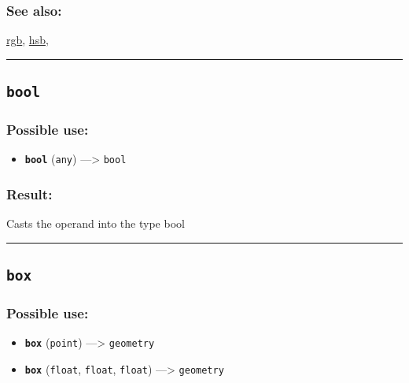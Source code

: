 \documentclass[]{book}
\providecommand{\tightlist}{%
  \setlength{\itemsep}{0pt}\setlength{\parskip}{0pt}}
\theoremstyle{definition}
\theoremstyle{definition}
\theoremstyle{definition}
\theoremstyle{remark}
\begin{document}
\subsubsection{See also:}\label{see-also-46}

\href{OperatorsNR\#rgb}{rgb}, \href{OperatorsDH\#hsb}{hsb},

\begin{center}\rule{0.5\linewidth}{\linethickness}\end{center}

\subsection{\texorpdfstring{\texttt{bool}}{bool}}\label{bool}

\subsubsection{Possible use:}\label{possible-use-75}

\begin{itemize}
\tightlist
\item
  \textbf{\texttt{bool}} (\texttt{any}) ---\textgreater{} \texttt{bool}
\end{itemize}

\subsubsection{Result:}\label{result-74}

Casts the operand into the type bool

\begin{center}\rule{0.5\linewidth}{\linethickness}\end{center}

\subsection{\texorpdfstring{\texttt{box}}{box}}\label{box}

\subsubsection{Possible use:}\label{possible-use-76}

\begin{itemize}
\tightlist
\item
  \textbf{\texttt{box}} (\texttt{point}) ---\textgreater{}
  \texttt{geometry}
\item
  \textbf{\texttt{box}} (\texttt{float}, \texttt{float}, \texttt{float})
  ---\textgreater{} \texttt{geometry}
\end{itemize}
\end{document}
